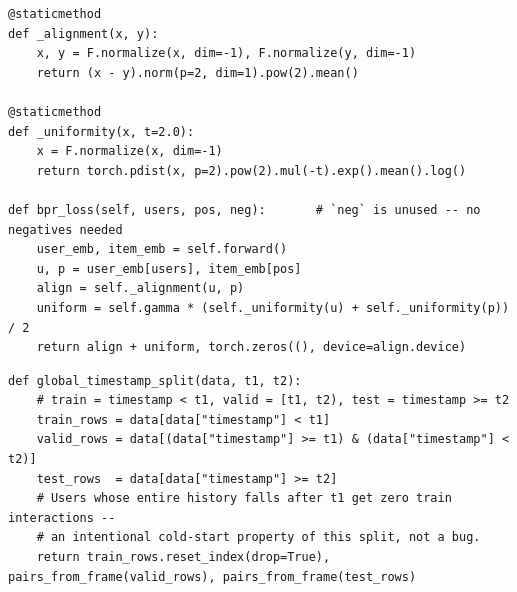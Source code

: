 \begin{lstlisting}[caption={DirectAU: trains with alignment + uniformity instead of BPR -- no negative sampling is needed at all (Wang et al., KDD'22).}, label={lst:directau}]
@staticmethod
def _alignment(x, y):
    x, y = F.normalize(x, dim=-1), F.normalize(y, dim=-1)
    return (x - y).norm(p=2, dim=1).pow(2).mean()

@staticmethod
def _uniformity(x, t=2.0):
    x = F.normalize(x, dim=-1)
    return torch.pdist(x, p=2).pow(2).mul(-t).exp().mean().log()

def bpr_loss(self, users, pos, neg):       # `neg` is unused -- no negatives needed
    user_emb, item_emb = self.forward()
    u, p = user_emb[users], item_emb[pos]
    align = self._alignment(u, p)
    uniform = self.gamma * (self._uniformity(u) + self._uniformity(p)) / 2
    return align + uniform, torch.zeros((), device=align.device)
\end{lstlisting}

\begin{lstlisting}[caption={Global timestamp split: a single cutoff pair $(t_1, t_2)$ is applied across every user (Amazon Reviews 2023 benchmark style), unlike a per-user leave-one-out split.}, label={lst:split}]
def global_timestamp_split(data, t1, t2):
    # train = timestamp < t1, valid = [t1, t2), test = timestamp >= t2
    train_rows = data[data["timestamp"] < t1]
    valid_rows = data[(data["timestamp"] >= t1) & (data["timestamp"] < t2)]
    test_rows  = data[data["timestamp"] >= t2]
    # Users whose entire history falls after t1 get zero train interactions --
    # an intentional cold-start property of this split, not a bug.
    return train_rows.reset_index(drop=True), pairs_from_frame(valid_rows), pairs_from_frame(test_rows)
\end{lstlisting}
